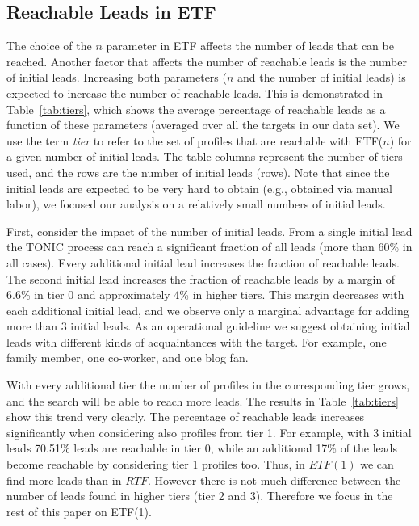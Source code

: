 \documentclass[journal]{IEEEtran}
\begin{document}
\subsection{Reachable Leads in ETF}
The choice of the $n$ parameter in ETF affects the number of leads that can be reached. Another factor that affects the number of reachable leads is the number of initial leads. 
Increasing both parameters ($n$ and the number of initial leads) is expected to increase the number of reachable leads. This is demonstrated in Table~\ref{tab:tiers}, which shows the average percentage of reachable leads as a function of these parameters (averaged over all the targets in our data set). We use the term {\em tier} to refer to the set of profiles that are reachable with ETF($n$) for a given number of initial leads.
The table columns represent the number of tiers used, and the rows are the number of initial leads (rows). Note that since the initial leads are expected to be very hard to obtain (e.g., obtained via manual labor), we focused our analysis on a relatively small numbers of initial leads.


First, consider the impact of the number of initial leads. 
From a single initial lead the TONIC process can reach a significant fraction of all leads (more than 60\% in all cases). 
Every additional initial lead increases the fraction of reachable leads. 
The second initial lead increases the fraction of reachable leads by a margin of 6.6\% in tier 0 and approximately 4\% in higher tiers. 
This margin decreases with each additional initial lead, and we observe only a marginal advantage for adding more than 3 initial leads. 
As an operational guideline we suggest obtaining initial leads with different kinds of acquaintances with the target. For example, one family member, one co-worker, and one blog fan. 


With every additional tier the number of profiles in the corresponding tier grows, and the search will be able to reach more leads. The results in Table~\ref{tab:tiers} show this trend very clearly. The percentage of reachable leads increases significantly when considering also profiles from tier 1. For example, with 3 initial leads 70.51\% leads are reachable in tier 0, while an additional 17\% of the leads become reachable by considering tier 1 profiles too. Thus, in \(ETF(1)\) we can find more leads than in \(RTF\). However there is not much difference between the number of leads found in higher tiers (tier 2 and 3). Therefore we focus in the rest of this paper on ETF(1). 
\end{document}
